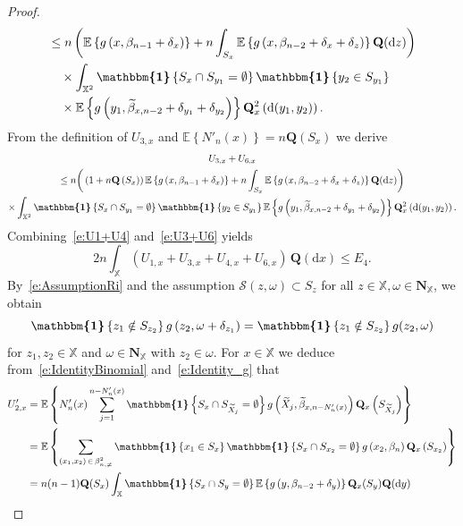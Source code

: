 \documentclass[10pt]{amsart}
\theoremstyle{definition}\newtheorem{defi}[theo]{Definition}\newtheorem{rema}[theo]{Remark}\newtheorem{exam}[theo]{Example}\newtheorem{exem}[theo]{Example}\newtheorem{nota}[theo]{Notation}
\newcommand*\bN{\mathbf{N}}
\newcommand{\bQ}{\mathbf{Q}}
\newcommand*\X{\mathbb{X}}
\newcommand{\E}{\mathbb{E}}
\newcommand*\cS{\mathcal{S}}
\newcommand*\md{\mathrm{d}}
\newcommand{\mean}[1] {\E\left\{{#1}\right\}}
\newcommand{\ind}{\boldsymbol{\mathbbm{1}}}
\begin{document}
\begin{proof}
\begin{align*}
& \leq n\left(\mean{g\left(x,\beta_{n-1}+\delta_x\right)} + n \int_{S_x} \mean{g\left(x,\beta_{n-2}+\delta_x+\delta_z\right)} \bQ(\md z) \right) \\
& \quad \times \int_{\X^2} \ind\left\{S_x\cap S_{y_1}=\emptyset\right\} \ind\left\{y_2\in S_{y_1}\right\}\\
&\quad \times\mean{g\left(y_1,\widetilde{\beta}_{x,n-2}+\delta_{y_1}+\delta_{y_2}\right)} \bQ^2_x\left(\md(y_1,y_2)\right).
\end{align*}
From the definition of $U_{3,x}$ and $\mean{N'_n(x)}=n \bQ(S_x)$ we derive
\begin{multline}\label{e:U3+U6}
U_{3,x}+U_{6,x}\\
\leq n\bigg(\left(1+n \bQ\left(S_x\right)\right) \mean{g\left(x,\beta_{n-1}+\delta_x\right)}
 + n \int_{S_x} \mean{g\left(x,\beta_{n-2}+\delta_x+\delta_z\right)} \bQ(\md z) \bigg) \\
 \times \int_{\X^2} \ind\left\{S_x\cap S_{y_1}=\emptyset\right\} \ind\left\{y_2\in S_{y_1}\right\}
 \mean{g\left(y_1,\widetilde{\beta}_{x,n-2}+\delta_{y_1}+\delta_{y_2}\right)} \bQ^2_x\left(\md(y_1,y_2)\right).
\end{multline}
Combining~\eqref{e:U1+U4} and~\eqref{e:U3+U6} yields
\begin{equation}\label{e:E4}
2n \int_{\X} \left(U_{1,x}+U_{3,x}+U_{4,x}+U_{6,x} \right) \, \bQ(\md x) \leq E_4.
\end{equation}
By~\eqref{e:AssumptionRi} and the assumption $\cS(z,\omega)\subset S_z$ for all $z\in \X, \omega\in\bN_{\X}$, we obtain
\begin{equation}\label{e:Identity_g}
\ind\left\{z_1\notin S_{z_2}\right\} g\left(z_2,\omega+\delta_{z_1}\right) = \ind\left\{z_1\notin S_{z_2}\right\} g(z_2,\omega)
\end{equation}
for $z_1,z_2\in\X$ and $\omega\in\bN_{\X}$ with $z_2\in\omega$. For $x\in\X$ we deduce from~\eqref{e:IdentityBinomial} and~\eqref{e:Identity_g} that
\begin{align*}
U'_{2,x} & = \mean{ N_n'(x) \sum_{j=1}^{n-N_n'(x)} \ind\left\{S_x\cap S_{\widetilde{X}_j} = \emptyset \right\} g\left(\widetilde{X}_j,\widetilde{\beta}_{x,n-N_n'(x)}\right) \bQ_x\left(S_{\widetilde{X}_j}\right)} \\
& = \mean{\sum_{\left(x_1,x_2\right)\,\in\,\beta_{n,\neq}^2} \ind\left\{x_1\in S_x\right\} \ind\left\{S_x\cap S_{x_2}=\emptyset\right\} g\left(x_2,\beta_n\right) \bQ_x\left(S_{x_2}\right)} \\
& = n(n-1) \bQ(S_x) \int_{\X} \ind\left\{S_x\cap S_y=\emptyset\right\} \mean{g\left(y,\beta_{n-2}+\delta_y\right)} \bQ_x(S_y) \bQ(\md y)

\end{align*}
\end{proof}
\end{document}

